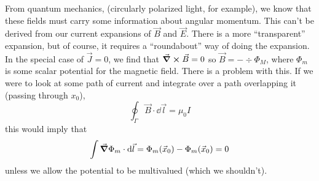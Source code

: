 \documentclass[a4paper,twoside,master.tex]{subfiles}
\begin{document}
From quantum mechanics, (circularly polarized light, for example), we know that these fields must carry some information about angular momentum. This can't be derived from our current expansions of $ \vec{B} $ and $ \vec{E} $. There is a more ``transparent'' expansion, but of course, it requires a ``roundabout'' way of doing the expansion. In the special case of $ \vec{J} = 0 $, we find that $ \curl{ \vec{B}} = 0 $ so $ \vec{B} = - \div{ \Phi_M} $, where $ \Phi_m $ is some scalar potential for the magnetic field. There is a problem with this. If we were to look at some path of current and integrate over a path overlapping it (passing through $ x_0 $),
\begin{equation}
    \oint_\Gamma \vec{B} \cdot \dd{ \vec{l}} = \mu_0 I
\end{equation}
this would imply that
\begin{equation}
    \int \grad{ \Phi_m} \cdot \dd{ \vec{l}} = \Phi_m( \vec{x}_0 ) - \Phi_m( \vec{x}_0 ) = 0
\end{equation}
unless we allow the potential to be multivalued (which we shouldn't).
\end{document}
